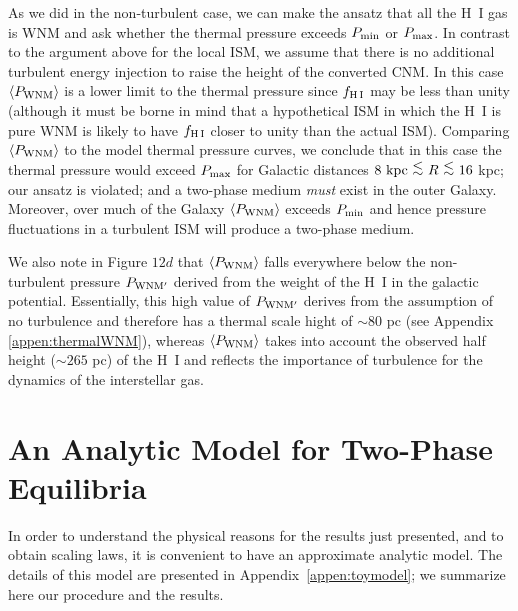 \documentclass[12pt,preprint,flushrt]{aastex}
\newcommand{\pmax}{P_{\rm max}}
\newcommand{\pmin}{P_{\rm min}}
\newcommand{\al}{\mbox{ \raisebox{-.4ex}{$\stackrel{\textstyle <}{\sim}$} }}
\begin{document}
As we did in the non-turbulent case, we can make the ansatz that all
the H~I gas is WNM and ask whether the thermal pressure exceeds
$\pmin$ or $\pmax$. 
In contrast to the argument above for the local ISM, we assume that
there is no additional turbulent energy injection to raise the height of the 
converted CNM.
In this case $\langle P_{\rm WNM} \rangle$ is 
a lower limit
to the thermal pressure since $f_{\rm H\, I}$ may be less than unity
(although it must be borne in mind that a hypothetical ISM in which
the H~I is pure WNM is likely to have $f_{\rm H\, I}$ closer to unity 
than the actual ISM).
Comparing $\langle P_{\rm WNM} \rangle$ to the model thermal pressure
curves, we conclude that in this case the thermal pressure would exceed
$\pmax$ for Galactic distances $8\,\,{\rm kpc}\al R \al 16$ kpc; our ansatz
is violated; and a two-phase medium {\em must} exist in the outer Galaxy.
Moreover, over much of the Galaxy 
$\langle P_{\rm WNM} \rangle$ exceeds $\pmin$ and hence 
pressure fluctuations in a turbulent ISM will produce a two-phase
medium. 

We also note in Figure $12d$ that $\langle P_{\rm WNM} \rangle$
falls
everywhere below the non-turbulent pressure $P_{\rm WNM'}$ derived from the 
weight of the H~I in the
galactic potential.  
Essentially, this high value of $P_{\rm WNM'}$ 
derives from the assumption of no turbulence and therefore
has a thermal scale hight of $\sim 80$ pc 
(see Appendix \ref{appen:thermalWNM}), whereas
$\langle P_{\rm WNM} \rangle$ takes into account 
the observed half height 
($\sim 265$ pc) of the H~I 
and reflects
the importance of turbulence for the
dynamics of the interstellar gas.  

\section{An Analytic Model for Two-Phase Equilibria}
\label{sec:toy}
In order to understand the physical reasons for the results just
presented, and to obtain scaling laws,
it is convenient to have an approximate analytic
model. The details of this model are presented in 
Appendix~\ref{appen:toymodel};
we summarize here our procedure and the results.
\end{document}
